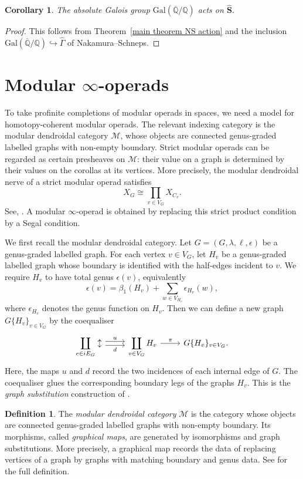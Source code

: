 \documentclass{amsart}
\newcommand{\bM}{\mathscr{M}}
\newcommand{\bS}{\mathbf{S}}
\newcommand{\galQ}{\mathbf{\mathrm{Gal}}(\overline{\mathbb{Q}}/\mathbb{Q})}
\newcommand{\NS}{\widehat{\mathsf{\Gamma}}}
\newcommand{\corolla}{C}
\newtheorem{cor}[theorem]{Corollary}%
\theoremstyle{definition}
\newtheorem{definition}[theorem]{Definition}%
\numberwithin{equation}{section}
\begin{document}
\begin{cor}
The absolute Galois group $\galQ$ acts on $\widehat{\bS}$.
\end{cor}

\begin{proof}
This follows from Theorem~\ref{main theorem NS action} and the inclusion
$\galQ\hookrightarrow \NS$ of Nakamura--Schneps.
\end{proof}
\section{Modular $\infty$-operads}\label{sec:modular infinity operads}

To take profinite completions of modular operads in spaces, we need a model for homotopy-coherent modular operads. The relevant indexing category is the modular dendroidal category $\bM$, whose objects are connected genus-graded labelled graphs with non-empty boundary. Strict modular operads can be regarded as certain presheaves on $\bM$: their value on a graph is determined by their values on the corollas at its vertices. More precisely, the modular dendroidal nerve of a strict modular operad satisfies
\[
X_G \cong \prod_{v\in V_G} X_{\corolla_v}.
\]
See, \cite[Theorem~3.6]{hry_modular_nerve}. A modular $\infty$-operad is obtained by replacing this strict product condition by a Segal condition.

We first recall the modular dendroidal category. Let $G=(G,\lambda,\ell,\epsilon)$ be a genus-graded labelled graph. For each vertex $v\in V_G$, let $H_v$ be a genus-graded labelled graph whose boundary is identified with the half-edges incident to $v$. We require $H_v$ to have total genus $\epsilon(v)$, equivalently
\[
\epsilon(v)=\beta_1(H_v)+\sum_{w\in V_{H_v}}\epsilon_{H_v}(w),
\] where $\epsilon_{H_v}$ denotes the genus function on $H_v$.  Then we can define a new graph $G\{H_v\}_{v\in V_G}$ by the coequaliser
\[
\begin{tikzcd}
\displaystyle\coprod_{e\in iE_G}\updownarrow
\arrow[r, shift left=1, "u"]
\arrow[r, shift right=1, "d"']
&
\displaystyle\coprod_{v\in V_G} H_v
\arrow[r, "\pi"]
&
G\{H_v\}_{v\in V_G}.
\end{tikzcd}
\] Here, the maps $u$ and $d$ record the two incidences of each internal edge of $G$. The coequaliser glues the corresponding boundary legs of the graphs $H_v$. This is the \emph{graph substitution} construction of \cite[Construction~1.18]{hry1}.


\begin{definition}\label{def: modular dendroidal category}
The \emph{modular dendroidal category} $\bM$ is the category whose objects are connected genus-graded labelled graphs with non-empty boundary. Its morphisms, called \emph{graphical maps}, are generated by isomorphisms and graph substitutions. More precisely, a graphical map records the data of replacing vertices of a graph by graphs with matching boundary and genus data. See \cite[Definition~1.31]{hry1} for the full definition.
\end{definition}
\end{document}

